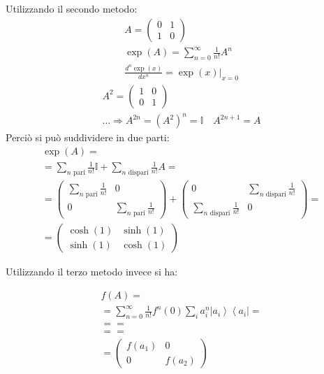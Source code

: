 Utilizzando il secondo metodo:
\begin{equation}\begin{split}
A=\left(\begin{matrix}0&1\\1&0\end{matrix}\right)\\
\exp{\left(A\right)}=\sum_{n=0}^{\infty }{\frac{1}{n!}A^n}\\
\frac{d^n\exp{\left(x\right)}}{dx^n}=\left.\exp{\left(x\right)}\right|_{x=0}
\end{split}\end{equation}
\begin{equation}\begin{split}
A^2=\left(\begin{matrix}1&0\\0&1\end{matrix}\right)\\
\dots \Longrightarrow A^{2n}=\left(A^2\right)^n=\mathbb{I} \quad A^{2n+1}=A
\end{split}\end{equation}
Perciò si può suddividere in due parti:
\begin{equation}\begin{split}
\exp{\left(A\right)}=\\
=\sum_{n \textrm{ pari}}{\frac{1}{n!}}\mathbb{I}+\sum_{n \textrm{ dispari}}{\frac{1}{n!}}A=\\
=\left(\begin{matrix}\sum_{n \textrm{ pari}}{\frac{1}{n!}}&0\\0&\sum_{n \textrm{ pari}}{\frac{1}{n!}}\end{matrix}\right)+\left(\begin{matrix}0&\sum_{n \textrm{ dispari}}{\frac{1}{n!}}\\\sum_{n \textrm{ dispari}}{\frac{1}{n!}}&0\end{matrix}\right)=\\
=\left(\begin{matrix}\cosh{\left(1\right)}&\sinh{\left(1\right)}\\\sinh{\left(1\right)}&\cosh{\left(1\right)}\end{matrix}\right)
\end{split}\end{equation}

Utilizzando il terzo metodo invece si ha:


\begin{equation}\begin{split}
f\left(A\right)=\\
=\sum_{n=0}^{\infty }{\frac{1}{n!}f^n\left(0\right)}\sum_i{a_i^n\left |a_i \right\rangle\left\langle a_i\right |}=\\
==\\
==\\
=\left(\begin{matrix}f\left(a_1\right)&0\\0&f\left(a_2\right)\end{matrix}\right)
\end{split}\end{equation}

